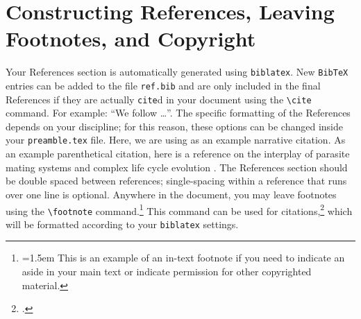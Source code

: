 \chapter[Constructing References, Leaving Footnotes, and Copyright]%
{%
  \label{ch:make-bib}%
  Constructing References, Leaving Footnotes, and Copyright\footnotemark
}
Your References section is automatically generated using \texttt{biblatex}.
New \texttt{BibTeX} entries can be added to the file \texttt{ref.bib} and are only included in the final References if they are actually \texttt{cite}d in your document using the \texttt{\backslash cite} command.
For example:
``We follow \cite{evans_pde}\ldots''.
The specific formatting of the References depends on your discipline; for this reason, these options can be changed inside your \texttt{preamble.tex} file.
Here, we are using \textcite{lax_hyperbolic} as an example narrative citation.
As an example parenthetical citation, here is a reference on the interplay of parasite mating systems and complex life cycle evolution \parencite{hulke_criscione}.
The References section should be double spaced between references; single-spacing within a reference that runs over one line is optional.
Anywhere in the document, you may leave footnotes using the \texttt{\backslash footnote} command.\footnote{%
  \noindent\hangindent=1.5em This is an example of an in-text footnote if you need to indicate an aside in your main text or indicate permission for other copyrighted material.%
}
This command can be used for citations,\footnote{%
  \Autocite{lax_hyperbolic}.%
}
which will be formatted according to your \texttt{biblatex} settings.

